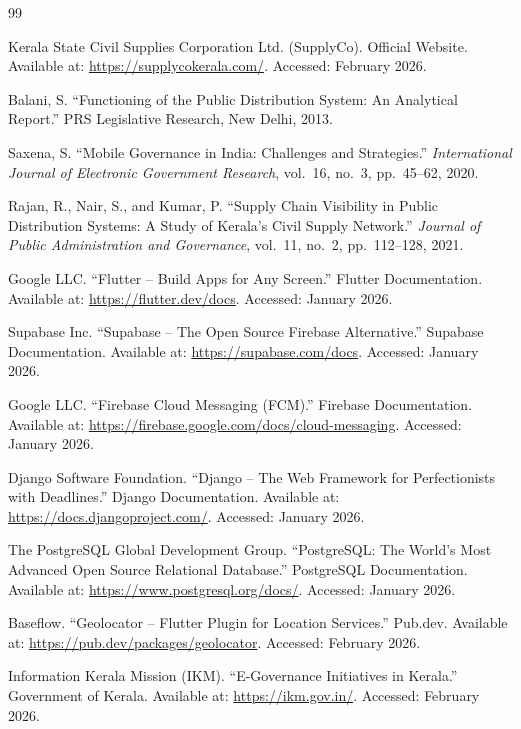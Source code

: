 \renewcommand{\bibname}{References}
{\titleformat{\chapter}[display]{\normalfont\LARGE\bfseries}{}{0pt}{\LARGE}
\titlespacing*{\chapter}{0pt}{-30pt}{20pt}
\begin{thebibliography}{99}

Kerala State Civil Supplies Corporation Ltd. (SupplyCo). Official Website. Available at: \url{https://supplycokerala.com/}. Accessed: February 2026.

Balani, S. ``Functioning of the Public Distribution System: An Analytical Report.'' PRS Legislative Research, New Delhi, 2013.

Saxena, S. ``Mobile Governance in India: Challenges and Strategies.'' \textit{International Journal of Electronic Government Research}, vol.~16, no.~3, pp.~45--62, 2020.

Rajan, R., Nair, S., and Kumar, P. ``Supply Chain Visibility in Public Distribution Systems: A Study of Kerala's Civil Supply Network.'' \textit{Journal of Public Administration and Governance}, vol.~11, no.~2, pp.~112--128, 2021.

Google LLC. ``Flutter -- Build Apps for Any Screen.'' Flutter Documentation. Available at: \url{https://flutter.dev/docs}. Accessed: January 2026.

Supabase Inc. ``Supabase -- The Open Source Firebase Alternative.'' Supabase Documentation. Available at: \url{https://supabase.com/docs}. Accessed: January 2026.

Google LLC. ``Firebase Cloud Messaging (FCM).'' Firebase Documentation. Available at: \url{https://firebase.google.com/docs/cloud-messaging}. Accessed: January 2026.

Django Software Foundation. ``Django -- The Web Framework for Perfectionists with Deadlines.'' Django Documentation. Available at: \url{https://docs.djangoproject.com/}. Accessed: January 2026.

The PostgreSQL Global Development Group. ``PostgreSQL: The World's Most Advanced Open Source Relational Database.'' PostgreSQL Documentation. Available at: \url{https://www.postgresql.org/docs/}. Accessed: January 2026.

Baseflow. ``Geolocator -- Flutter Plugin for Location Services.'' Pub.dev. Available at: \url{https://pub.dev/packages/geolocator}. Accessed: February 2026.

Information Kerala Mission (IKM). ``E-Governance Initiatives in Kerala.'' Government of Kerala. Available at: \url{https://ikm.gov.in/}. Accessed: February 2026.

\end{thebibliography}}
